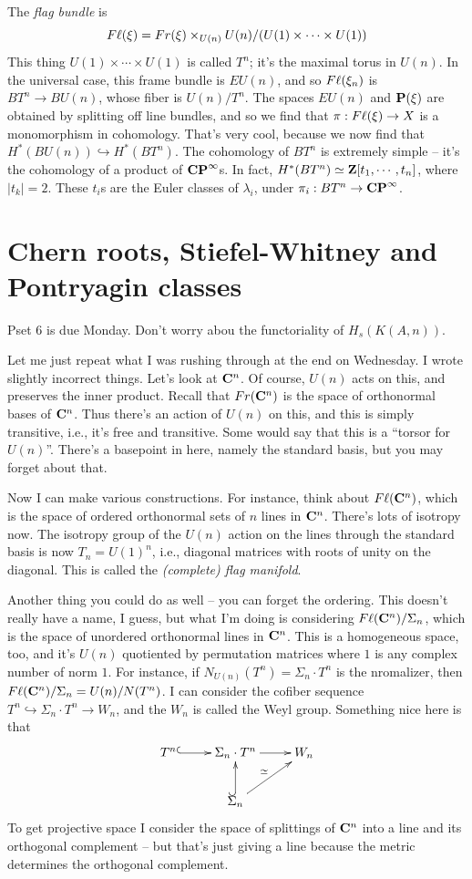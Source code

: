 The \emph{flag bundle} is
$$F\ell(\xi) = Fr(\xi)\times_{U(n)} U(n)/(U(1)\times\cdots\times U(1))$$
This thing $U(1)\times\cdots\times U(1)$ is called $T^n$; it's the maximal torus in $U(n)$.
In the universal case, this frame bundle is $EU(n)$, and so $F\ell(\xi_n)$ is $BT^n\to BU(n)$, whose fiber is $U(n)/T^n$.
The spaces $EU(n)$ and $\mathbf P(\xi)$ are obtained by splitting off line bundles, and so we find that $\pi:F\ell(\xi)\to X$ is a monomorphism in cohomology.
That's very cool, because we now find that $H^\ast(BU(n)) \hookrightarrow H^\ast(BT^n)$.
The cohomology of $BT^n$ is extremely simple -- it's the cohomology of a product of $\mathbf{CP}^\infty$s.
In fact, $H^\ast(BT^n) \simeq \mathbf Z[t_1,\cdots,t_n]$, where $|t_k| = 2$.
These $t_i$s are the Euler classes of $\lambda_i$, under $\pi_i:BT^n\to\mathbf{CP}^\infty$.
\section{Chern roots, Stiefel-Whitney and Pontryagin classes}
Pset 6 is due Monday.
Don't worry abou the functoriality of $H_s(K(A,n))$.

Let me just repeat what I was rushing through at the end on Wednesday.
I wrote slightly incorrect things.
Let's look at $\mathbf C^n$.
Of course, $U(n)$ acts on this, and preserves the inner product.
Recall that $Fr(\mathbf C^n)$ is the space of orthonormal bases of $\mathbf C^n$.
Thus there's an action of $U(n)$ on this, and this is simply transitive, i.e., it's free and transitive.
Some would say that this is a ``torsor for $U(n)$''.
There's a basepoint in here, namely the standard basis, but you may forget about that.

Now I can make various constructions.
For instance, think about $F\ell(\mathbf C^n)$, which is the space of ordered orthonormal sets of $n$ lines in $\mathbf C^n$.
There's lots of isotropy now.
The isotropy group of the $U(n)$ action on the lines through the standard basis is now $T_n=U(1)^n$, i.e., diagonal matrices with roots of unity on the diagonal.
This is called the \emph{(complete) flag manifold}.

Another thing you could do as well -- you can forget the ordering.
This doesn't really have a name, I guess, but what I'm doing is considering $F\ell(\mathbf C^n)/\Sigma_n$, which is the space of unordered orthonormal lines in $\mathbf C^n$.
This is a homogeneous space, too, and it's $U(n)$ quotiented by permutation matrices where $1$ is any complex number of norm $1$.
For instance, if $N_{U(n)}(T^n) = \Sigma_n\cdot T^n$ is the nromalizer, then $F\ell(\mathbf C^n)/\Sigma_n = U(n)/N(T^n)$.
I can consider the cofiber sequence $T^n\hookrightarrow \Sigma_n\cdot T^n \to W_n$, and the $W_n$ is called the Weyl group.
Something nice here is that
\begin{equation*}
    \xymatrix{
	T^n\ar@{^(->}[r] & \Sigma_n\cdot T^n\ar[r] & W_n\\
	& \Sigma_n\ar@{^(->}[u]\ar[ur]^\simeq & 
    }
\end{equation*}
To get projective space I consider the space of splittings of $\mathbf C^n$ into a line and its orthogonal complement -- but that's just giving a line because the metric determines the orthogonal complement.

